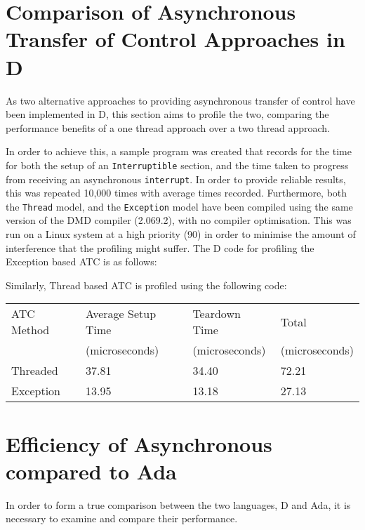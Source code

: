 \section{Comparison of Asynchronous Transfer of Control Approaches in D}
As two alternative approaches to providing asynchronous transfer of control
have been implemented in D, this section aims to profile the two, comparing the
performance benefits of a one thread approach over a two thread approach. 
\par\bigskip\noindent
In order to achieve this, a sample program was created that records for the
time for both the
setup of an \texttt{Interruptible} section, and the time taken to progress from
receiving an asynchronous \texttt{interrupt}. In order to provide reliable results,
this was repeated 10,000 times with average times recorded. Furthermore, both
the \texttt{Thread} model, and the \texttt{Exception} model have been compiled 
using the same version of the DMD compiler (2.069.2), with no compiler
optimisation. This was run on a Linux system at a high
priority (90) in order to minimise the amount of interference that the
profiling might suffer. 
The D code for profiling the Exception based ATC is as follows: 

Similarly, Thread based ATC is profiled using the following code: 

\begin{table}[!htbp]
\begin{tabular}{l|lll}
ATC Method & Average Setup Time & Teardown Time  & Total \\
           & (microseconds)     & (microseconds) & (microseconds) \\ \hline
Threaded   & 37.81              & 34.40          & 72.21  \\
Exception  & 13.95              & 13.18          & 27.13  \\
\end{tabular}
\end{table}

\section{Efficiency of Asynchronous compared to Ada}
In order to form a true comparison between the two languages, D and Ada, it is
necessary to examine and compare their performance.



